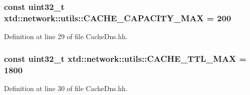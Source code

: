 \subsubsection[{\texorpdfstring{C\+A\+C\+H\+E\+\_\+\+C\+A\+P\+A\+C\+I\+T\+Y\+\_\+\+M\+AX}{CACHE_CAPACITY_MAX}}]{\setlength{\rightskip}{0pt plus 5cm}const uint32\+\_\+t xtd\+::network\+::utils\+::\+C\+A\+C\+H\+E\+\_\+\+C\+A\+P\+A\+C\+I\+T\+Y\+\_\+\+M\+AX = 200}\hypertarget{namespacextd_1_1network_1_1utils_a8939e806c4a6bc08b78a32941db7a130}{}\label{namespacextd_1_1network_1_1utils_a8939e806c4a6bc08b78a32941db7a130}


Definition at line 29 of file Cache\+Dns.\+hh.

\subsubsection[{\texorpdfstring{C\+A\+C\+H\+E\+\_\+\+T\+T\+L\+\_\+\+M\+AX}{CACHE_TTL_MAX}}]{\setlength{\rightskip}{0pt plus 5cm}const uint32\+\_\+t xtd\+::network\+::utils\+::\+C\+A\+C\+H\+E\+\_\+\+T\+T\+L\+\_\+\+M\+AX = 1800}\hypertarget{namespacextd_1_1network_1_1utils_adb4767541db3a79016a24142db705161}{}\label{namespacextd_1_1network_1_1utils_adb4767541db3a79016a24142db705161}


Definition at line 30 of file Cache\+Dns.\+hh.

